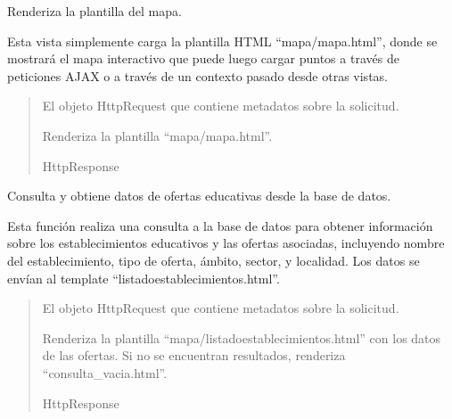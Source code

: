 \documentclass[letterpaper,10pt,spanish]{sphinxmanual}
\begin{document}
\begin{fulllineitems}

\pysigstartsignatures
{}
\pysigstopsignatures
\sphinxAtStartPar
Renderiza la plantilla del mapa.

\sphinxAtStartPar
Esta vista simplemente carga la plantilla HTML “mapa/mapa.html”, donde se
mostrará el mapa interactivo que puede luego cargar puntos a través de
peticiones AJAX o a través de un contexto pasado desde otras vistas.
\begin{quote}\begin{description}
\sphinxAtStartPar
{} \textendash{} El objeto HttpRequest que contiene metadatos sobre la solicitud.

\sphinxAtStartPar
Renderiza la plantilla “mapa/mapa.html”.

\sphinxAtStartPar
HttpResponse

\end{description}\end{quote}

\end{fulllineitems}



\begin{fulllineitems}

\pysigstartsignatures
{}
\pysigstopsignatures
\sphinxAtStartPar
Consulta y obtiene datos de ofertas educativas desde la base de datos.

\sphinxAtStartPar
Esta función realiza una consulta a la base de datos para obtener información
sobre los establecimientos educativos y las ofertas asociadas, incluyendo
nombre del establecimiento, tipo de oferta, ámbito, sector, y localidad.
Los datos se envían al template “listadoestablecimientos.html”.
\begin{quote}\begin{description}
\sphinxAtStartPar
{} \textendash{} El objeto HttpRequest que contiene metadatos sobre la solicitud.

\sphinxAtStartPar
Renderiza la plantilla “mapa/listadoestablecimientos.html” con los datos de las ofertas.
Si no se encuentran resultados, renderiza “consulta\_vacia.html”.

\sphinxAtStartPar
HttpResponse

\end{description}\end{quote}

\end{fulllineitems}
\end{document}

